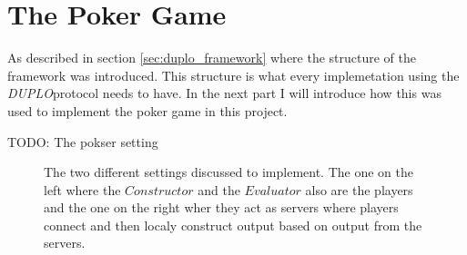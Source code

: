 \documentclass[twoside,11pt,openright]{report}
\newcommand{\todo}[1]{}
\renewcommand{\todo}[1]{{\color{red} TODO: {#1}} \\}
\newcommand{\DUPLO}{\textit{DUPLO}}
\begin{document}
\section{The Poker Game}
As described in section \ref{sec:duplo_framework} where the structure of the framework was introduced. This structure is what every implemetation using the \DUPLO protocol needs to have. In the next part I will introduce how this was used to implement the poker game in this project.

\bigskip

\todo{The pokser setting}
\begin{figure}
\centering

\caption{The two different settings discussed to implement. The one on the left where the $Constructor$ and the $Evaluator$ also are the players and the one on the right wher they act as servers where players connect and then localy construct output based on output from the servers.}
\label{fig:poker_setting}
\end{figure}
\end{document}
